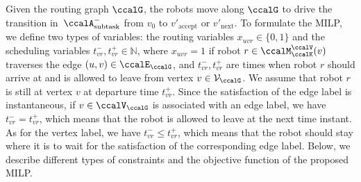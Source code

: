 \documentclass[Afour,sageh,times]{sagej}
\newcommand{\auto}[1]{\ccalA_{\textup{#1}}}
\begin{document}
Given the routing graph $\ccalG$, the robots move along $\ccalG$ to drive the transition in~$\auto{subtask}^-$ from $v_0$ to $v'_{\text{accept}}$ or $v'_{\text{next}}$. To formulate the MILP, we define two types of variables: the routing variables $x_{uvr} \in\{0, 1\}$ and the scheduling variables $t^-_{vr}, t^+_{vr} \in \mathbb{N}$, where $x_{uvr}=1$  if robot  $r\in \ccalM^\ccalV_\ccalK(v)$ traverses the edge $(u,v) \in \ccalE_\ccalG$, and $t^-_{vr}, t^+_{vr}$ are times when robot $r$ should arrive at and is allowed to leave from vertex $v \in \mathcal{V}_\ccalG$. We assume that robot $r$ is still at vertex $v$ at departure time $t^+_{vr}$. Since the satisfaction of the edge label is instantaneous, if $v \in \ccalV_\ccalG$ is associated with an edge label, we have
  $t_{vr}^- = t_{vr}^+$, which means that the robot is allowed to leave at the next time instant. As for the vertex label, we have $t_{vr}^-  \leq t_{vr}^+$, which means that the robot should stay where it is to wait for the satisfaction of the corresponding edge label. Below, we describe  different types of constraints and the objective function of the proposed MILP.
\end{document}
